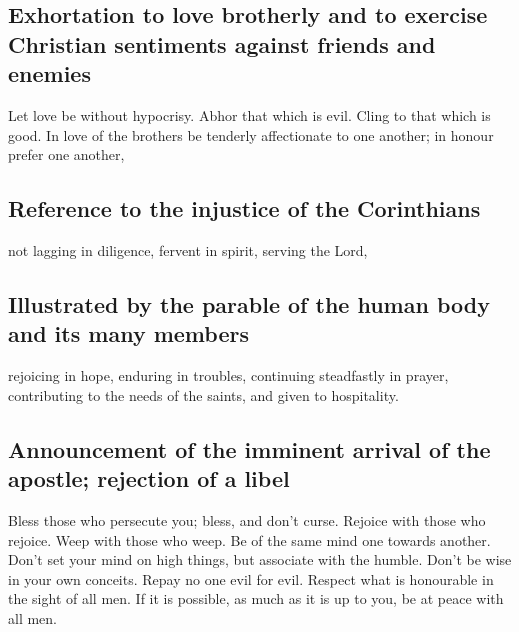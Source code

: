 \hypertarget{exhortation-to-love-brotherly-and-to-exercise-christian-sentiments-against-friends-and-enemies}{%
\subsection{Exhortation to love brotherly and to exercise Christian
sentiments against friends and
enemies}\label{exhortation-to-love-brotherly-and-to-exercise-christian-sentiments-against-friends-and-enemies}}

 Let love be without hypocrisy. Abhor that which is evil.
Cling to that which is good.  In love of the brothers be
tenderly affectionate to one another; in honour prefer one another,

\hypertarget{reference-to-the-injustice-of-the-corinthians}{%
\subsection{Reference to the injustice of the
Corinthians}\label{reference-to-the-injustice-of-the-corinthians}}

 not lagging in diligence, fervent in spirit, serving the
Lord,

\hypertarget{illustrated-by-the-parable-of-the-human-body-and-its-many-members}{%
\subsection{Illustrated by the parable of the human body and its many
members}\label{illustrated-by-the-parable-of-the-human-body-and-its-many-members}}

 rejoicing in hope, enduring in troubles, continuing
steadfastly in prayer,  contributing to the needs of the
saints, and given to hospitality.

\hypertarget{announcement-of-the-imminent-arrival-of-the-apostle-rejection-of-a-libel}{%
\subsection{Announcement of the imminent arrival of the apostle;
rejection of a
libel}\label{announcement-of-the-imminent-arrival-of-the-apostle-rejection-of-a-libel}}

 Bless those who persecute you; bless, and don't curse.
 Rejoice with those who rejoice. Weep with those who
weep.  Be of the same mind one towards another. Don't set
your mind on high things, but associate with the humble. Don't be wise
in your own conceits.  Repay no one evil for evil.
Respect what is honourable in the sight of all men.  If
it is possible, as much as it is up to you, be at peace with all men.

